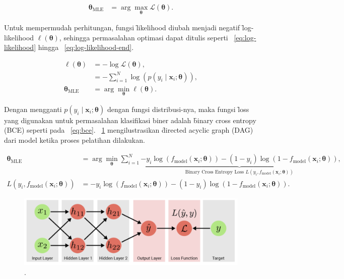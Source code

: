     \begin{align}
        \bm{\theta}_{\text{MLE}} &= \arg\max_{\bm{\theta}} \mathcal{L}(\bm{\theta}).
    \end{align}

    Untuk mempermudah perhitungan, fungsi \f{likelihood} diubah menjadi negatif \f{log-likelihood} $\mathcal{\ell}(\bm{\theta})$, sehingga permasalahan optimasi dapat ditulis seperti \equ~\ref{eq:log-likelihood} hingga \equ~\ref{eq:log-likelihood-end}.

    \begin{align}
        \label{eq:log-likelihood}
        \ell{(\bm{\theta})} &= -\log\mathcal{L}(\bm{\theta}), \\
        &= -\sum_{i=1}^N \log\left(p(y_i \mid \mathbf{x}_i; \bm{\theta})\right), \\
        \label{eq:log-likelihood-end}
        \bm{\theta}_{\text{MLE}} &= \arg\min_{\bm{\theta}} \ell(\bm{\theta}).
    \end{align} 

    Dengan mengganti $p(y_i \mid \mathbf{x}_i; \bm{\theta})$ dengan fungsi distribusi-nya, maka fungsi \f{loss} yang digunakan untuk permasalahan klasifikasi biner adalah \f{binary cross entropy} (BCE) seperti pada \equ~\ref{eq:bce}. \pic~\ref{fig:dl-training-graph-dag} mengilustrasikan \f{directed acyclic graph} (DAG) dari model ketika proses pelatihan dilakukan.

    \begin{align}
        \bm{\theta}_{\text{MLE}} &= \arg\min_{\bm{\theta}}\sum_{i=1}^{N}\underbrace{-y_i \log\left(f_{\text{model}}(\mathbf{x}_i; \bm{\theta})\right) - (1 - y_i) \log\left(1 - f_{\text{model}}(\mathbf{x}_i; \bm{\theta})\right)}_{\text{Binary Cross Entropy Loss } L(y_i, f_{\text{model}}(\mathbf{x}_i; \bm{\theta}))}, \\
        \label{eq:bce} 
        L(y_i, f_{\text{model}}(\mathbf{x}_i; \bm{\theta})) &= -y_i \log\left(f_{\text{model}}(\mathbf{x}_i; \bm{\theta})\right) - (1 - y_i) \log\left(1 - f_{\text{model}}(\mathbf{x}_i; \bm{\theta})\right).
    \end{align}

    \begin{figure}
        \centering
        \includegraphics[width=1\textwidth]{assets/pics/dl-training-graph.png}
        \caption{\license.}
        \label{fig:dl-training-graph-dag}
    \end{figure}

